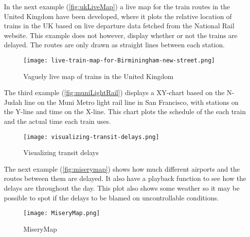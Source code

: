 In the next example (\vref{fig:ukLiveMap}) a live map for the train 
routes in the United Kingdom have been developed, where it plots the relative 
location of trains in the UK based on live departure data fetched from the 
National Rail website. This example does not however, display whether or not 
the trains are delayed. The routes are only drawn as straight lines between each station.

\begin{figure}[!htbp]
	\texttt{[image: live-train-map-for-Birminingham-new-street.png]}
	\caption[Vaguely live map of trains in the United Kingdom]{Vaguely live map of trains in the United Kingdom \cite{ukLiveMap}}
	\label{fig:ukLiveMap}
\end{figure}
\pagebreak

The third example (\vref{fig:muniLightRail}) displays a XY-chart based on the 
N-Judah line on the Muni Metro light rail line in San Francisco, with stations 
on the Y-line and time on the X-line. This chart plots the schedule of the each
train and the actual time each train uses.

\begin{figure}[!htbp]
	\texttt{[image: visualizing-transit-delays.png]}
	\caption[Visualizing transit delays]{Visualizing transit delays \cite{muniLightRail}}
	\label{fig:muniLightRail}
\end{figure}
\pagebreak

The next example (\vref{fig:miserymap}) shows how much different airports and 
the routes between them are delayed. It also have a playback function to see
how the delays are throughout the day. This plot also shows some weather so it
may be possible to spot if the delays to be blamed on uncontrollable
conditions. 

\begin{figure}[!htbp]
	\texttt{[image: MiseryMap.png]}
	\caption[MiseryMap]{MiseryMap \cite{flightAware:MiseryMap}}
	\label{fig:miserymap}
\end{figure}
\pagebreak
 
